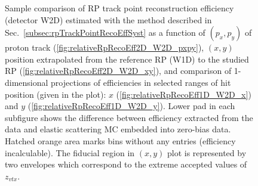 \begin{figure}[h]
{\begin{subfigure}[b]{\linewidth}
		\end{subfigure}
	}
	\caption[Coparison of estimated RP track point reconstruction efficiency in 2D and 1D (detector W2D).]%
	{Sample comparison of RP track point reconstruction efficiency (detector W2D) estimated with the method described in Sec.~\ref{subsec:rpTrackPointRecoEffSyst} as a function of $(p_{x},p_{y})$ of proton track (\ref{fig:relativeRpRecoEff2D_W2D_pxpy}), $(x,y)$ position extrapolated from the reference RP (W1D) to the studied RP (\ref{fig:relativeRpRecoEff2D_W2D_xy}), and comparison of 1-dimensional projections of efficiencies in selected ranges of hit position (given in the plot): $x$ (\ref{fig:relativeRpRecoEff1D_W2D_x}) and $y$ (\ref{fig:relativeRpRecoEff1D_W2D_y}). Lower pad in each subfigure shows the difference between efficiency extracted from the data and elastic scattering MC embedded into zero-bias data. Hatched orange area marks bins without any entries (efficiency incalculable). The fiducial region in $(x,y)$ plot is represented by two envelopes which correspond to the extreme accepted values of $z_{vtx}$.%
	}\label{fig:relativeRpRecoEff_W2D}
\end{figure}
